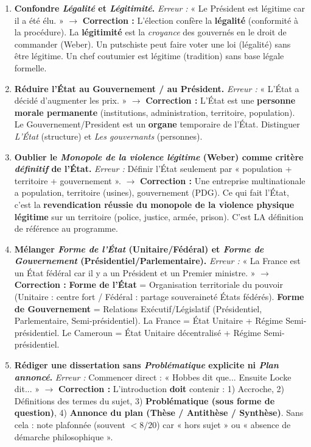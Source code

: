 \documentclass[11pt]{article}
\begin{document}
\begin{attention}
\begin{enumerate}
    \item \textbf{Confondre \emph{Légalité} et \emph{Légitimité}.}
    \emph{Erreur :} « Le Président est légitime car il a été élu. » $\rightarrow$ \textbf{Correction :} L'élection confère la \textbf{légalité} (conformité à la procédure). La \textbf{légitimité} est la \emph{croyance} des gouvernés en le droit de commander (Weber). Un putschiste peut faire voter une loi (légalité) sans être légitime. Un chef coutumier est légitime (tradition) sans base légale formelle.
    \item \textbf{Réduire l'État au Gouvernement / au Président.}
    \emph{Erreur :} « L'État a décidé d'augmenter les prix. » $\rightarrow$ \textbf{Correction :} L'État est une \textbf{personne morale permanente} (institutions, administration, territoire, population). Le Gouvernement/President est un \textbf{organe} temporaire de l'État. Distinguer \emph{L'État} (structure) et \emph{Les gouvernants} (personnes).
    \item \textbf{Oublier le \emph{Monopole de la violence légitime} (Weber) comme critère \emph{définitif} de l'État.}
    \emph{Erreur :} Définir l'État seulement par « population + territoire + gouvernement ». $\rightarrow$ \textbf{Correction :} Une entreprise multinationale a population, territoire (usines), gouvernement (PDG). Ce qui fait l'État, c'est la \textbf{revendication réussie du monopole de la violence physique légitime} sur un territoire (police, justice, armée, prison). C'est LA définition de référence au programme.
    \item \textbf{Mélanger \emph{Forme de l'État} (Unitaire/Fédéral) et \emph{Forme de Gouvernement} (Présidentiel/Parlementaire).}
    \emph{Erreur :} « La France est un État fédéral car il y a un Président et un Premier ministre. » $\rightarrow$ \textbf{Correction :} \textbf{Forme de l'État} = Organisation territoriale du pouvoir (Unitaire : centre fort / Fédéral : partage souveraineté États fédérés). \textbf{Forme de Gouvernement} = Relations Exécutif/Législatif (Présidentiel, Parlementaire, Semi-présidentiel). La France = État Unitaire + Régime Semi-présidentiel. Le Cameroun = État Unitaire décentralisé + Régime Semi-présidentiel.
    \item \textbf{Rédiger une dissertation sans \emph{Problématique} explicite ni \emph{Plan annoncé}.}
    \emph{Erreur :} Commencer direct : « Hobbes dit que... Ensuite Locke dit... » $\rightarrow$ \textbf{Correction :} L'introduction \textbf{doit} contenir : 1) Accroche, 2) Définitions des termes du sujet, 3) \textbf{Problématique (sous forme de question)}, 4) \textbf{Annonce du plan (Thèse / Antithèse / Synthèse)}. Sans cela : note plafonnée (souvent $< 8/20$) car « hors sujet » ou « absence de démarche philosophique ».
\end{enumerate}
\end{attention}
\end{document}

